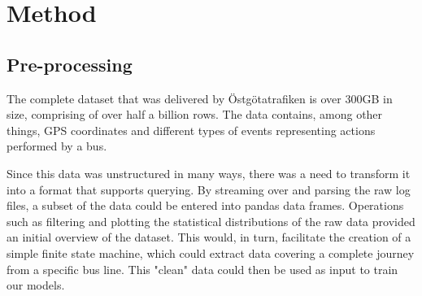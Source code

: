 
\chapter{Method}
\label{cha:method}

\section{Pre-processing}\label{pre-processing}
\label{sec:pre-processing}
The complete dataset that was delivered by Östgötatrafiken is over 300GB in size, comprising of over half a billion rows. The data contains, among other things, GPS coordinates and different types of events representing actions performed by a bus. 

Since this data was unstructured in many ways, there was a need to transform it into a format that supports querying. By streaming over and parsing the raw log files, a subset of the data could be entered into pandas data frames. Operations such as filtering and plotting the statistical distributions of the raw data provided an initial overview of the dataset. This would, in turn, facilitate the creation of a simple finite state machine, which could extract data covering a complete journey from a specific bus line. This "clean" data could then be used as input to train our models.

